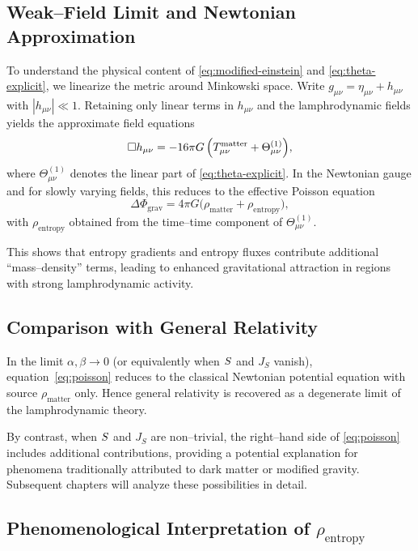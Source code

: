 \subsection{Weak--Field Limit and Newtonian Approximation}

To understand the physical content of \eqref{eq:modified-einstein} and
\eqref{eq:theta-explicit}, we linearize the metric around Minkowski space.
Write $g_{\mu\nu} = \eta_{\mu\nu} + h_{\mu\nu}$ with $|h_{\mu\nu}|\ll 1$.
Retaining only linear terms in $h_{\mu\nu}$ and the lamphrodynamic fields
yields the approximate field equations
\begin{equation}
\label{eq:weak-field}
  \Box h_{\mu\nu}
   = -16\pi G\,
      \Bigl(
          T^{\mathrm{matter}}_{\mu\nu}
        + \Theta^{(1)}_{\mu\nu}
      \Bigr),
\end{equation}
where $\Theta^{(1)}_{\mu\nu}$ denotes the linear part of
\eqref{eq:theta-explicit}. In the Newtonian gauge and for slowly varying
fields, this reduces to the effective Poisson equation
\begin{equation}
\label{eq:poisson}
  \Delta \Phi_{\mathrm{grav}}
  = 4\pi G\bigl(\rho_{\mathrm{matter}}
             + \rho_{\mathrm{entropy}}\bigr),
\end{equation}
with $\rho_{\mathrm{entropy}}$ obtained from the time--time component of
$\Theta^{(1)}_{\mu\nu}$.

This shows that entropy gradients and entropy fluxes contribute additional
``mass–density'' terms, leading to enhanced gravitational attraction in regions
with strong lamphrodynamic activity.

\subsection{Comparison with General Relativity}

In the limit $\alpha,\beta\to 0$ (or equivalently when $S$ and $J_S$
vanish), equation~\eqref{eq:poisson} reduces to the classical Newtonian
potential equation with source $\rho_{\mathrm{matter}}$ only. Hence general
relativity is recovered as a degenerate limit of the lamphrodynamic theory.

By contrast, when $S$ and $J_S$ are non--trivial, the right--hand side of
\eqref{eq:poisson} includes additional contributions, providing a potential
explanation for phenomena traditionally attributed to dark matter or modified
gravity. Subsequent chapters will analyze these possibilities in detail.

\subsection{Phenomenological Interpretation of $\rho_{\mathrm{entropy}}$}

